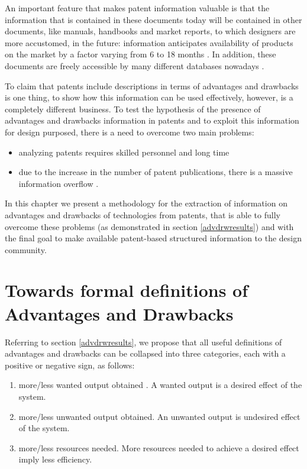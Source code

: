 \documentclass[]{book}
\providecommand{\tightlist}{%
  \setlength{\itemsep}{0pt}\setlength{\parskip}{0pt}}
\begin{document}
An important feature that makes patent information valuable is that the
information that is contained in these documents today will be contained
in other documents, like manuals, handbooks and market reports, to which
designers are more accustomed, in the future: information anticipates
availability of products on the market by a factor varying from 6 to 18
months \citep{golzio2012}. In addition, these documents are freely
accessible by many different databases nowadays \citep{kim2015patent}.

To claim that patents include descriptions in terms of advantages and
drawbacks is one thing, to show how this information can be used
effectively, however, is a completely different business. To test the
hypothesis of the presence of advantages and drawbacks information in
patents and to exploit this information for design purposed, there is a
need to overcome two main problems:

\begin{itemize}
\tightlist
\item
  analyzing patents requires skilled personnel and long time
  \citep{leon2007trends}
\item
  due to the increase in the number of patent publications, there is a
  massive information overflow \citep{bergmann2008evaluating}.
\end{itemize}

In this chapter we present a methodology for the extraction of
information on advantages and drawbacks of technologies from patents,
that is able to fully overcome these problems (as demonstrated in
section \ref{advdrwresults}) and with the final goal to make available
patent-based structured information to the design community.

\section{Towards formal definitions of Advantages and
Drawbacks}\label{towards-formal-definitions-of-advantages-and-drawbacks}

Referring to section \ref{advdrwresults}, we propose that all useful
definitions of advantages and drawbacks can be collapsed into three
categories, each with a positive or negative sign, as follows:

\begin{enumerate}
\def\labelenumi{\arabic{enumi}.}
\tightlist
\item
  more/less wanted output obtained . A wanted output is a desired effect
  of the system.
\item
  more/less unwanted output obtained. An unwanted output is undesired
  effect of the system.
\item
  more/less resources needed. More resources needed to achieve a desired
  effect imply less efficiency.
\end{enumerate}
\end{document}
